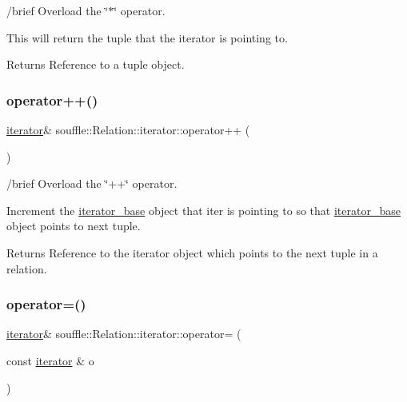 /brief Overload the \char`\"{}$\ast$\char`\"{} operator.

This will return the tuple that the iterator is pointing to. \begin{DoxyReturn}{Returns}
Reference to a tuple object. 
\end{DoxyReturn}
\mbox{\label{classsouffle_1_1_relation_1_1iterator_aecb299b7a3d19a15a3c76e0eb4c90ef0}} 
\subsubsection{\texorpdfstring{operator++()}{operator++()}}
{\footnotesize\ttfamily \hyperlink{classsouffle_1_1_relation_1_1iterator}{iterator}\& souffle\+::\+Relation\+::iterator\+::operator++ (\begin{DoxyParamCaption}{ }\end{DoxyParamCaption})\hspace{0.3cm}{\ttfamily [inline]}}

/brief Overload the \char`\"{}++\char`\"{} operator.

Increment the \hyperlink{classsouffle_1_1_relation_1_1iterator__base}{iterator\+\_\+base} object that iter is pointing to so that \hyperlink{classsouffle_1_1_relation_1_1iterator__base}{iterator\+\_\+base} object points to next tuple. \begin{DoxyReturn}{Returns}
Reference to the iterator object which points to the next tuple in a relation. 
\end{DoxyReturn}
\mbox{\label{classsouffle_1_1_relation_1_1iterator_abf5f84682b367458ef3865e854275cf8}} 
\subsubsection{\texorpdfstring{operator=()}{operator=()}}
{\footnotesize\ttfamily \hyperlink{classsouffle_1_1_relation_1_1iterator}{iterator}\& souffle\+::\+Relation\+::iterator\+::operator= (\begin{DoxyParamCaption}\item[{const \hyperlink{classsouffle_1_1_relation_1_1iterator}{iterator} \&}]{o }\end{DoxyParamCaption})\hspace{0.3cm}{\ttfamily [inline]}}

